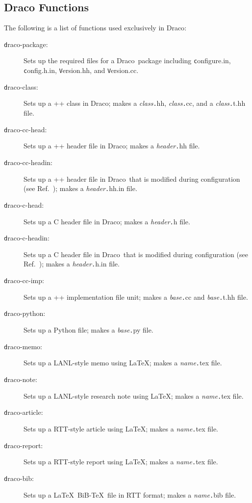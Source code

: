 \documentclass[11pt]{nmemo}
\newcommand{\comp}[1]{{\normalfont\texttt#1}}
\newcommand{\draco}{{\normalfont\sffamily Draco}}
\begin{document}
\subsection{Draco Functions}
\label{sec:dfunc}

The following is a list of functions used exclusively in \draco:
\begin{description}
\item[\comp{draco-package}:] Sets up the required files for a \draco\ 
  package including \comp{configure.in}, \comp{config.h.in},
  \comp{Version.hh}, and \comp{Version.cc}.
\item[\comp{draco-class}:] Sets up a \C++ class in \draco; makes a
  \textsl{class}\comp{.hh}, \textsl{class}\comp{.cc}, and a
  \textsl{class}\comp{.t.hh} file.
\item[\comp{draco-cc-head}:] Sets up a \C++ header file in \draco;
  makes a \textsl{header}\comp{.hh} file.
\item[\comp{draco-cc-headin}:] Sets up a \C++ header file in \draco\ 
  that is modified during configuration (see Ref.~\cite{draco-build});
  makes a \textsl{header}\comp{.hh.in} file.
\item[\comp{draco-c-head}:] Sets up a C header file in \draco; makes a 
  \textsl{header}\comp{.h} file.
\item[\comp{draco-c-headin}:] Sets up a C header file in \draco\ that
  is modified during configuration (see Ref.~\cite{draco-build});
  makes a \textsl{header}\comp{.h.in} file.
\item[\comp{draco-cc-imp}:] Sets up a \C++ implementation file unit;
  makes a \textsl{base}\comp{.cc} and \textsl{base}\comp{.t.hh} file.
\item[\comp{draco-python}:] Sets up a Python file; makes a
  \textsl{base}\comp{.py} file.
\item[\comp{draco-memo}:] Sets up a LANL-style memo using \LaTeX;
  makes a \textsl{name}\comp{.tex} file.
\item[\comp{draco-note}:] Sets up a LANL-style research note using
  \LaTeX; makes a \textsl{name}\comp{.tex} file.
\item[\comp{draco-article}:] Sets up a RTT-style article using \LaTeX;
  makes a \textsl{name}\comp{.tex} file.
\item[\comp{draco-report}:] Sets up a RTT-style report using \LaTeX;
  makes a \textsl{name}\comp{.tex} file.
\item[\comp{draco-bib}:] Sets up a \LaTeX\ BiB-\TeX\ file in RTT
  format; makes a \textsl{name}\comp{.bib} file.
\end{description}
\end{document}
